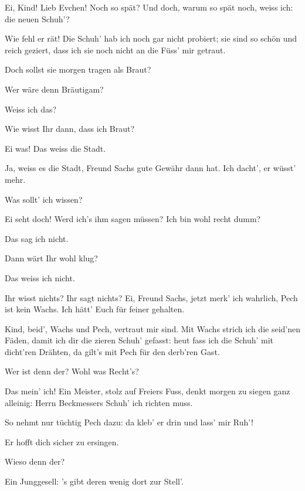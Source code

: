 \begin{drama}
\Sachsspeaks


Ei, Kind!
Lieb Evchen! Noch so spät?
Und doch, warum so spät noch, weiss ich:
die neuen Schuh'?

\Evaspeaks
Wie fehl er rät!
Die Schuh' hab ich noch gar nicht probiert;
sie sind so schön und reich geziert,
dass ich sie noch nicht an die Füss' mir getraut.



\Sachsspeaks
Doch sollst sie morgen tragen als Braut?

\Evaspeaks
Wer wäre denn Bräutigam?

\Sachsspeaks
Weiss ich das?

\Evaspeaks
Wie wisst Ihr dann, dass ich Braut?

\Sachsspeaks
Ei was! Das weiss die Stadt.

\Evaspeaks
Ja, weiss es die Stadt,
Freund Sachs gute Gewähr dann hat.
Ich dacht', er wüsst' mehr.

\Sachsspeaks
Was sollt' ich wissen?

\Evaspeaks
Ei seht doch! Werd ich's ihm sagen müssen?
Ich bin wohl recht dumm?

\Sachsspeaks
Das sag ich nicht.

\Evaspeaks
Dann wärt Ihr wohl klug?

\Sachsspeaks
Das weiss ich nicht.

\Evaspeaks
Ihr wisst nichts? Ihr sagt nichts? Ei, Freund Sachs,
jetzt merk' ich wahrlich, Pech ist kein Wachs.
Ich hätt' Euch für feiner gehalten.

\Sachsspeaks
Kind,
beid', Wachs und Pech, vertraut mir sind.
Mit Wachs strich ich die seid'nen Fäden,
damit ich dir die zieren Schuh' gefasst:
heut fass ich die Schuh' mit dicht'ren Drähten,
da gilt's mit Pech für den derb'ren Gast.

\Evaspeaks
Wer ist denn der? Wohl was Recht's?

\Sachsspeaks
Das mein' ich!
Ein Meister, stolz auf Freiers Fuss,
denkt morgen zu siegen ganz alleinig:
Herrn Beckmessers Schuh' ich richten muss.

\Evaspeaks
So nehmt nur tüchtig Pech dazu:
da kleb' er drin und lass' mir Ruh'!

\Sachsspeaks
Er hofft dich sicher zu ersingen.

\Evaspeaks
Wieso denn der?

\Sachsspeaks
Ein Junggesell:
's gibt deren wenig dort zur Stell'.


\end{drama}
